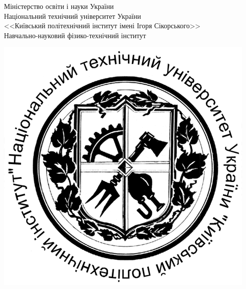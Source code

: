 \begin{titlepage}
    \newpage

    \begin{minipage}[c]{\linewidth}

        \newlength{\maxpreambula}

        \hspace{5cm}\parbox{\maxpreambula}{
            \begin{spacing}{1.1}\small{
                Міністерство освіти і науки України \\
                Національний технічний університет України \\
                <<Київський політехнічний інститут імені Ігоря Сікорського>> \\
                Навчально-науковий фізико-технічний інститут }
            \end{spacing}
        }
            
        \vspace*{-2.35cm}
        \hspace*{1.5cm}
        \includegraphics[width=0.13\paperwidth]{kpi_emblem.png}

    \end{minipage}
    
    \vspace{\fill}
    

\end{titlepage}

